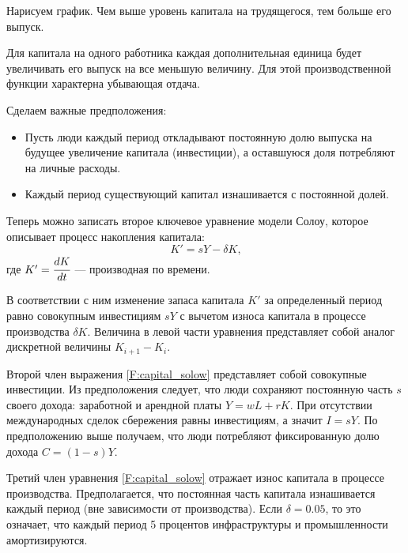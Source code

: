 Нарисуем график.
Чем выше уровень капитала на трудящегося, тем больше его выпуск.

\begin{center}
\end{center}
Для капитала на одного работника каждая дополнительная единица будет увеличивать его выпуск на все меньшую величину.
Для этой производственной функции характерна убывающая отдача.

Сделаем важные предположения:
\begin{itemize}
	\item Пусть люди каждый период откладывают постоянную долю выпуска на будущее увеличение капитала (инвестиции), а оставшуюся доля потребляют на личные расходы.
	\item Каждый период существующий капитал  изнашивается с постоянной долей.
\end{itemize}
Теперь можно записать второе ключевое уравнение модели Солоу, которое описывает процесс накопления капитала:
\begin{equation}
K' = sY-\delta K \text{,}
\label{F:capital_solow}
\end{equation}
где $K' = \cfrac{dK}{dt}$ --- производная по времени.

В соответствии с ним изменение запаса капитала $K'$ за определенный период равно совокупным инвестициям $sY$ с вычетом износа капитала в процессе производства $\delta K$.
Величина в левой части уравнения представляет собой аналог дискретной величины $K_{i+1} - K_{i}$.

Второй член выражения \ref {F:capital_solow} представляет собой совокупные инвестиции.
Из предположения следует, что люди сохраняют постоянную часть $s$ своего дохода: заработной и арендной платы $Y=wL+rK$.
При отсутствии международных сделок сбережения равны инвестициям, а значит $I=sY$.
По предположению выше получаем, что люди потребляют фиксированную долю дохода $C=(1-s)Y$.

Третий член уравнения \ref {F:capital_solow} отражает износ капитала в процессе производства.
Предполагается, что постоянная часть капитала изнашивается каждый период (вне зависимости от производства).
Если $\delta = 0.05$, то это означает, что каждый период 5 процентов инфраструктуры и промышленности амортизируются.

